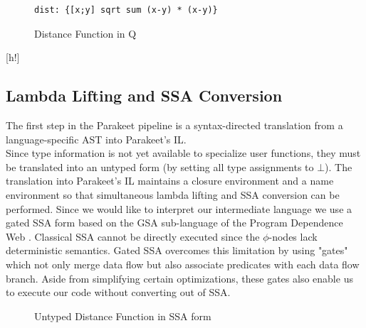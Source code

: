 \documentclass[preprint]{sigplanconf}
\begin{document}
\begin{figure}[h!]

    \begin{lstlisting}[numbers=none]
    dist: {[x;y] sqrt sum (x-y) * (x-y)}
    \end{lstlisting}
    \caption{Distance Function in Q}
\end{figure}[h!]

\subsection{Lambda Lifting and SSA Conversion } 
The first step in the Parakeet pipeline is a syntax-directed translation from a language-specific AST into Parakeet's IL.\\
Since type information is not yet available to specialize user functions, they must be translated into an untyped form (by setting all type assignments to $\bot$). 
The translation into Parakeet's IL maintains a closure environment and a name environment so that simultaneous lambda lifting and SSA conversion can be performed. 
Since we would like to interpret our intermediate language we use a gated SSA form based on the GSA sub-language of the Program Dependence Web \cite{Ott90}. Classical SSA cannot be directly executed since the $\phi$-nodes lack deterministic semantics. Gated SSA overcomes this limitation by using "gates" which not only merge data flow but also associate predicates with each data flow branch. Aside from simplifying certain optimizations, these gates also enable us to execute our code without converting out of SSA. 


\begin{figure}[h!]
\caption{Untyped Distance Function in SSA form}
\end{figure}
\end{document}
